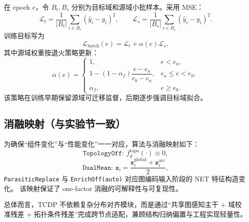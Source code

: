﻿\documentclass[10pt,a4paper]{ctexart}
\begin{document}
在 epoch $e$，令 $B_t,B_s$ 分别为目标域和源域小批样本。采用 MSE：
\begin{equation}
\mathcal{L}_t = \frac{1}{|B_t|}\sum_{i\in B_t}(\hat y_i-y_i)^2,\qquad
\mathcal{L}_s = \frac{1}{|B_s|}\sum_{i\in B_s}(\hat y_i-y_i)^2.
\end{equation}
训练目标写为
\begin{equation}
\mathcal{L}_{\mathrm{batch}}(e)=\mathcal{L}_t+\alpha(e)\mathcal{L}_s,
\end{equation}
其中源域权重按退火策略更新：
\begin{equation}
\alpha(e)=
\begin{cases}
1, & e<e_a,\\
1-(1-\alpha_f)\dfrac{e-e_a}{e_b-e_a}, & e_a\le e<e_b,\\
\alpha_f, & e\ge e_b.
\end{cases}
\end{equation}
该策略在训练早期保留源域可迁移监督，后期逐步强调目标域拟合。

\subsection{消融映射（与实验节一致）}

为确保“组件变化”与“性能变化”一一对应，算法与消融映射如下：
\begin{equation}
\texttt{TopologyOff}: \ f^{\mathrm{topo}}_{d}(\cdot)\equiv 0,
\end{equation}
\begin{equation}
\texttt{DualMean}: \ \mathbf{z}_i=\frac{\mathbf{z}_i^{\mathrm{global}}+\mathbf{z}_i^{\mathrm{arc}}}{2},
\end{equation}
\texttt{ParasiticReplace} 与 \texttt{EnrichOff(auto)} 对应图编码输入阶段的 NET 特征构造变化。
该映射保证了 one-factor 消融的可解释性与可复现性。

总体而言，TCDP 不依赖复杂分布对齐模块，而是通过“共享图感知主干 + 域校准残差 + 拓扑条件残差”完成跨节点适配，兼顾结构归纳偏置与工程实现轻量性。
\end{document}
